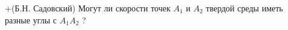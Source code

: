 +(Б.Н. Садовский)
Могут ли скорости точек $A_{1}$ и $A_{2}$ твердой среды иметь разные углы с
$A_{1}A_{2}$ ?
